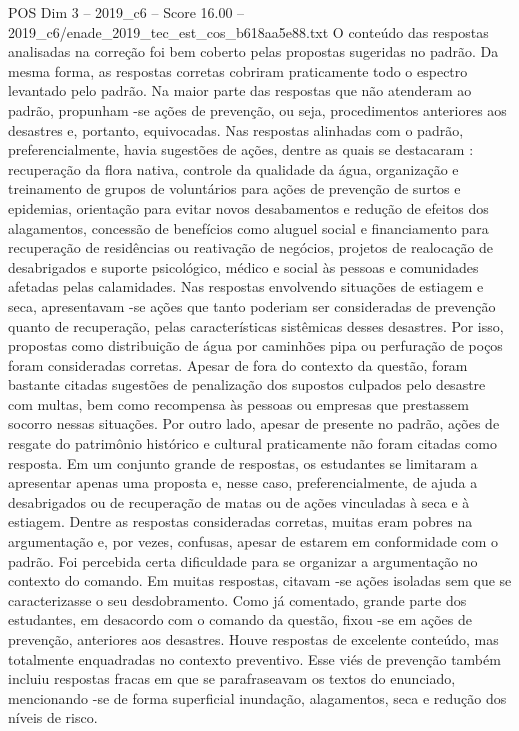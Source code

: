 \begin{textsample}{POS Dim 3 – 2019\_c6 – Score 16.00 – 2019\_c6/enade\_2019\_tec\_est\_cos\_b618aa5e88.txt}
O conteúdo das respostas analisadas na correção foi bem coberto pelas propostas sugeridas no padrão.
Da mesma forma, as respostas corretas cobriram praticamente todo o espectro levantado pelo padrão.
Na maior parte das respostas que não atenderam ao padrão, propunham -se ações de prevenção, ou seja, procedimentos anteriores aos desastres e, portanto, equivocadas.
Nas respostas alinhadas com o padrão, preferencialmente, havia sugestões de ações, dentre as quais se destacaram : recuperação da flora nativa, controle da qualidade da água, organização e treinamento de grupos de voluntários para ações de prevenção de surtos e epidemias, orientação para evitar novos desabamentos e redução de efeitos dos alagamentos, concessão de benefícios como aluguel social e financiamento para recuperação de residências ou reativação de negócios, projetos de realocação de desabrigados e suporte psicológico, médico e social às pessoas e comunidades afetadas pelas calamidades.
Nas respostas envolvendo situações de estiagem e seca, apresentavam -se ações que tanto poderiam ser consideradas de prevenção quanto de recuperação, pelas características sistêmicas desses desastres.
Por isso, propostas como distribuição de água por caminhões pipa ou perfuração de poços foram consideradas corretas.
Apesar de fora do contexto da questão, foram bastante citadas sugestões de penalização dos supostos culpados pelo desastre com multas, bem como recompensa às pessoas ou empresas que prestassem socorro nessas situações.
Por outro lado, apesar de presente no padrão, ações de resgate do patrimônio histórico e cultural praticamente não foram citadas como resposta.
Em um conjunto grande de respostas, os estudantes se limitaram a apresentar apenas uma proposta e, nesse caso, preferencialmente, de ajuda a desabrigados ou de recuperação de matas ou de ações vinculadas à seca e à estiagem.
Dentre as respostas consideradas corretas, muitas eram pobres na argumentação e, por vezes, confusas, apesar de estarem em conformidade com o padrão.
Foi percebida certa dificuldade para se organizar a argumentação no contexto do comando.
Em muitas respostas, citavam -se ações isoladas sem que se caracterizasse o seu desdobramento.
Como já comentado, grande parte dos estudantes, em desacordo com o comando da questão, fixou -se em ações de prevenção, anteriores aos desastres.
Houve respostas de excelente conteúdo, mas totalmente enquadradas no contexto preventivo.
Esse viés de prevenção também incluiu respostas fracas em que se parafraseavam os textos do enunciado, mencionando -se de forma superficial inundação, alagamentos, seca e redução dos níveis de risco.

\end{textsample}
